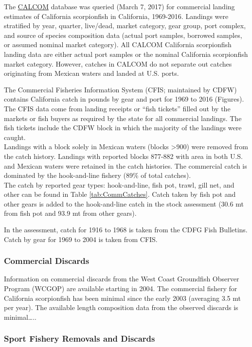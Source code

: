 \documentclass[12pt,]{article}
\begin{document}
The \href{http://128.114.3.187/}{CALCOM} database was queried (March 7,
2017) for commercial landing estimates of California scorpionfish in
California, 1969-2016. Landings were stratified by year, quarter,
live/dead, market category, gear group, port complex, and source of
species composition data (actual port samples, borrowed samples, or
assumed nominal market category). All CALCOM California scorpionfish
landing data are either actual port samples or the nominal California
scorpionfish market category. However, catches in CALCOM do not separate
out catches originating from Mexican waters and landed at U.S. ports.

The Commercial Fisheries Information System (CFIS; maintained by CDFW)
contains California catch in pounds by gear and port for 1969 to 2016
(Figures). The CFIS data come from landing receipts or ``fish tickets''
filled out by the markets or fish buyers as required by the state for
all commercial landings. The fish tickets include the CDFW block in
which the majority of the landings were caught.\\
Landings with a block solely in Mexican waters (blocks
\textgreater{}900) were removed from the catch history. Landings with
reported blocks 877-882 with area in both U.S. and Mexican waters were
retained in the catch histories. The commercial catch is dominated by
the hook-and-line fishery (89\% of total catches).\\
The catch by reported gear types: hook-and-line, fish pot, trawl, gill
net, and other can be found in Table \ref{tab:CommCatches}. Catch taken
by fish pot and other gears is added to the hook-and-line catch in the
stock assessment (30.6 mt from fish pot and 93.9 mt from other gears).

In the assessment, catch for 1916 to 1968 is taken from the CDFG Fish
Bulletins. Catch by gear for 1969 to 2004 is taken from CFIS.

\subsubsection{Commercial Discards}\label{commercial-discards}

Information on commercial discards from the West Coast Groundfish
Observer Program (WCGOP) are available starting in 2004. The commercial
fishery for California scorpionfish has been minimal since the early
2003 (averaging 3.5 mt per year). The available length composition data
from the observed discards is minimal\ldots{}..

\subsubsection{Sport Fishery Removals and
Discards}\label{sport-fishery-removals-and-discards}
\end{document}

